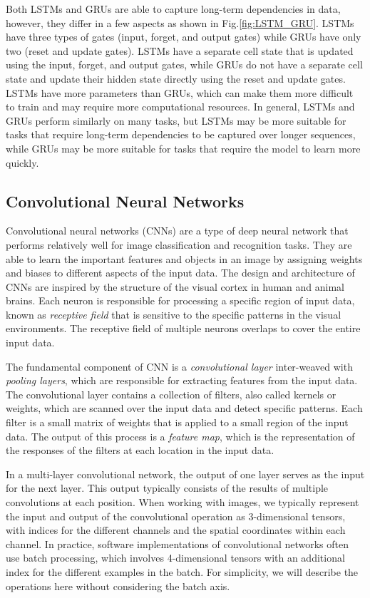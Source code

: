 Both LSTMs and GRUs are able to capture long-term dependencies in data, however, they differ in a few aspects as shown in Fig.\ref{fig:LSTM_GRU}. LSTMs have three types of gates (input, forget, and output gates) while GRUs have only two (reset and update gates). LSTMs have a separate cell state that is updated using the input, forget, and output gates, while GRUs do not have a separate cell state and update their hidden state directly using the reset and update gates. LSTMs have more parameters than GRUs, which can make them more difficult to train and may require more computational resources. In general, LSTMs and GRUs perform similarly on many tasks, but LSTMs may be more suitable for tasks that require long-term dependencies to be captured over longer sequences, while GRUs may be more suitable for tasks that require the model to learn more quickly.

\subsection{Convolutional Neural Networks}

Convolutional neural networks (CNNs) are a type of deep neural network that performs relatively well for image classification and recognition tasks. They are able to learn the important features and objects in an image by assigning weights and biases to different aspects of the input data. The design and architecture of CNNs are inspired by the structure of the visual cortex in human and animal brains. Each neuron is responsible for processing a specific region of input data, known as \textit{receptive field} that is sensitive to the specific patterns  in the visual environments. The receptive field of multiple neurons overlaps to cover the entire input data.

The fundamental component of CNN is a \textit{convolutional layer} inter-weaved with \textit{pooling layers}, which are responsible for extracting features from the input data. The convolutional layer contains a collection of filters, also called kernels or weights, which are scanned over the input data and detect specific patterns. Each filter is a small matrix of weights that is applied to a small region of the input data.
The output of this process is a \textit{feature map}, which is the representation of the responses of the filters at each location in the input data. 

In a multi-layer convolutional network, the output of one layer serves as the input for the next layer. This output typically consists of the results of multiple convolutions at each position. When working with images, we typically represent the input and output of the convolutional operation as 3-dimensional tensors, with indices for the different channels and the spatial coordinates within each channel. In practice, software implementations of convolutional networks often use batch processing, which involves 4-dimensional tensors with an additional index for the different examples in the batch. For simplicity, we will describe the operations here without considering the batch axis.



